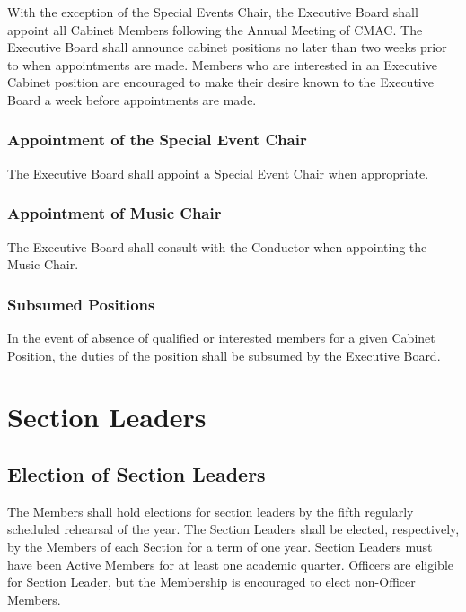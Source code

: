 \documentclass{article}
\begin{document}
With the exception of the Special Events Chair, the Executive Board
shall appoint all Cabinet Members following the Annual Meeting of
CMAC. The Executive Board shall announce cabinet positions no later
than two weeks prior to when appointments are made. Members who are
interested in an Executive Cabinet position are encouraged to make
their desire known to the Executive Board a week before appointments
are made.

\subsubsection{Appointment of the Special Event Chair}

The Executive Board shall appoint a Special Event Chair when appropriate.

\subsubsection{Appointment of Music Chair}

The Executive Board shall consult with the Conductor when appointing
the Music Chair.

\subsubsection{Subsumed Positions}

In the event of absence of qualified or interested members for a given
Cabinet Position, the duties of the position shall be subsumed by
the Executive Board.

\section{Section Leaders}

\subsection{Election of Section Leaders}

The Members shall hold elections for section leaders by the fifth
regularly scheduled rehearsal of the year. The Section Leaders shall
be elected, respectively, by the Members of each Section for a term
of one year. Section Leaders must have been Active Members for at
least one academic quarter. Officers are eligible for Section Leader,
but the Membership is encouraged to elect non-Officer Members.
\end{document}

